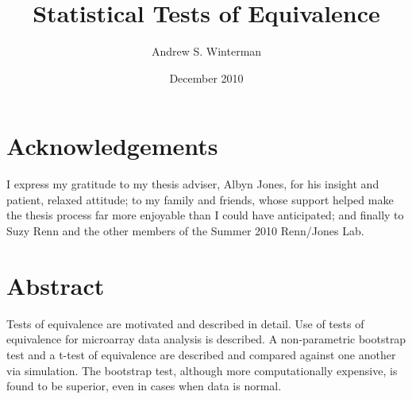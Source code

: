 \documentclass[12pt,twoside]{reedthesis}
\title{Statistical Tests of Equivalence}
\author{Andrew S. Winterman}
\date{December 2010}
\begin{document}
\maketitle{}
  \frontmatter
  \pagestyle{empty} 


 \chapter*{Acknowledgements}
 I express my gratitude to my thesis adviser, Albyn Jones, for his insight and patient, relaxed attitude; to my family and friends, whose support helped make the thesis process far more enjoyable than I could have anticipated; and finally to Suzy Renn and the other members of the Summer 2010 Renn/Jones Lab.
 
\tableofcontents

\chapter*{Abstract}

	Tests of equivalence are motivated and described in detail. Use of tests of equivalence for microarray data analysis is described. A non-parametric bootstrap test and a t-test of equivalence are described and compared against one another via simulation. The bootstrap test, although more computationally expensive, is found to be superior, even in cases when data is normal.

  \mainmatter 
  \pagestyle{fancyplain}
  







\appendix
     
     


                                                                                                                                                                                                                                                                                                                              \nocite{*}
\end{document}
